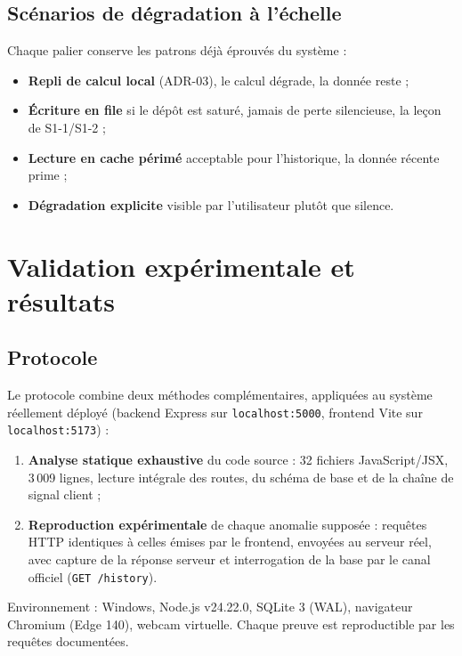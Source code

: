 \documentclass[11pt,a4paper]{article}
\begin{document}
\subsection{Scénarios de dégradation à l'échelle}
Chaque palier conserve les patrons déjà éprouvés du système :
\begin{itemize}[leftmargin=1.5em,itemsep=1pt,topsep=2pt,parsep=0pt]
 \item \textbf{Repli de calcul local} (ADR-03), le calcul dégrade, la donnée reste ;
 \item \textbf{Écriture en file} si le dépôt est saturé, jamais de perte silencieuse, la leçon
 de S1-1/S1-2 ;
 \item \textbf{Lecture en cache périmé} acceptable pour l'historique, la donnée récente prime ;
 \item \textbf{Dégradation explicite} visible par l'utilisateur plutôt que silence.
\end{itemize}

\section{Validation expérimentale et résultats}
\label{sec:validation}

\subsection{Protocole}
\label{sec:protocole}
Le protocole combine deux méthodes complémentaires, appliquées au système réellement déployé
(backend Express sur \texttt{localhost:5000}, frontend Vite sur \texttt{localhost:5173}) :

\begin{enumerate}[leftmargin=1.8em]
 \item \textbf{Analyse statique exhaustive} du code source : 32 fichiers JavaScript/JSX, 3\,009 lignes,
 lecture intégrale des routes, du schéma de base et de la chaîne de signal client ;
 \item \textbf{Reproduction expérimentale} de chaque anomalie supposée : requêtes HTTP identiques à
 celles émises par le frontend, envoyées au serveur réel, avec capture de la réponse serveur et
 interrogation de la base par le canal officiel (\texttt{GET /history}).
\end{enumerate}

Environnement : Windows, Node.js v24.22.0, SQLite 3 (WAL), navigateur Chromium (Edge 140), webcam
virtuelle. Chaque preuve est reproductible par les requêtes documentées.
\end{document}
